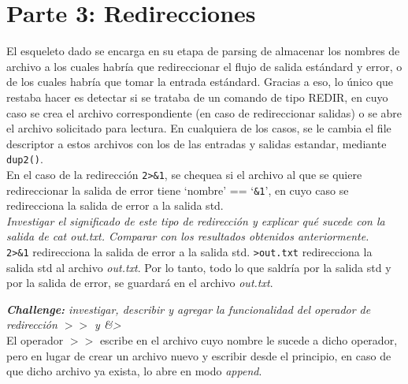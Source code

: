 \documentclass{article}
\begin{document}
\newpage
\section{Parte 3: Redirecciones}
El esqueleto dado se encarga en su etapa de parsing de almacenar los nombres de archivo a los cuales habría que redireccionar el flujo de salida estándard y error, o de los cuales habría que tomar la entrada estándard. Gracias a eso, lo único que restaba hacer es detectar si se trataba de un comando de tipo REDIR, en cuyo caso se crea el archivo correspondiente (en caso de redireccionar salidas) o se abre el archivo solicitado para lectura. En cualquiera de los casos, se le cambia el file descriptor a estos archivos con los de las entradas y salidas estandar, mediante \texttt{dup2()}.\\

En el caso de la redirección \texttt{2\textgreater\&1}, se chequea si el archivo al que se quiere redireccionar la salida de error tiene `nombre' == `\texttt{\&1}', en cuyo caso se redirecciona la salida de error a la salida std. \\

\textit{Investigar el significado de este tipo de redirección y explicar qué sucede con la salida de cat out.txt. Comparar con los resultados obtenidos anteriormente.}\\
\texttt{2\textgreater\&1} redirecciona la salida de error a la salida std. \texttt{\textgreater out.txt} redirecciona la salida std al archivo \textit{out.txt}. Por lo tanto, todo lo que saldría por la salida std y por la salida de error, se guardará en el archivo \textit{out.txt}.


\textit{\textbf{Challenge:} investigar, describir y agregar la funcionalidad del operador de redirección $>>$ y \&\textgreater}\\

El operador \texttt{$>>$} escribe en el archivo cuyo nombre le sucede a dicho operador, pero en lugar de crear un archivo nuevo y escribir desde el principio, en caso de que dicho archivo ya exista, lo abre en modo \textit{append}. \\
\end{document}
